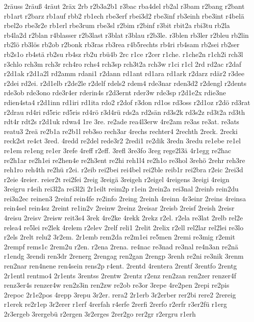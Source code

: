 {2räuss
2räuß
4räut
2räx
2rb
r2b3a2b1
r3bac
rba4del
rb2al
r3bam
r2bang
r2bant
rb1art
r2barz
rb1auf
rbb2
rb1ech
rbe3erf
rbei3d2
rbe3inf
rb3einh
rbe3int
r4belä
rbel2o
rbe3r2e
rb1erl
rbe3rum
rbe3sl
r2bim
r2binf
r3bit
rbit2a
rbi3tu
rb2la
rb4la2d
r2blan
r4blasser
r2b3last
r3blat
r3blau
r2b3le.
r3blen
rb3ler
r2bleu
rb2lin
rb2lö
rb3lös
rb2ob
r2bonk
rb3ras
rb3rea
r4b5rechts
rb4ri
rb4sam
rb2sei
rb2ser
rb2s1o
rb4stä
rb2su
rb4sz
rb2u
rbü4b
2rc
r1ce
r2cer
r1che.
r1che2n
r1ch2i
rch3l
r3chlo
rch3m
rch3r
rch4ro
rchs4
rch3sp
rch3t2a
rch3w
r1ci
r1cl
2rd
rd2ac
r2daf
r2d1ak
r2d1a2l
rd2amm
rdani1
r2dann
rd1ant
rd1ara
rd1ark
r2darz
rdär2
r3dee
r2dei
rd2ei.
r2d1elb
r2de2le
r2delf
rdels2
rdem4
rde3nar
rden3d2
r2dengl
r2dents
rde3ob
rde3ono
rde3r4er
rderin4s
r2d3ernt
rder3w
rde3sp
r2d1e2x
rdie3ne
rdien4sta4
r2d1inn
rd1iri
rd1ita
rdo2
r2dof
r3don
rd1os
rd3oss
r2d1oz
r2dö
rd3rat
r2drau
rd4ri
rd5ric
rd5ris
rd4rö
r3d4rü
rds2a
rd2sän
rd3s2k
rd3s2z
rd3t2a
rd3th
rdt4r
rdt2s
r2d1uk
rdwa4
1re
3re.
re2ade
rea4l3erw
4re2am
re3as
re3at.
re3ats
reatu3
2reä
re2b1a
re2b1l
reb3so
rech3ar
4rechs
rechter4
2rechth
2reck.
2recki
reck2st
re4ct
3red.
4redd
re2del
rede3r2
2redi1
re2dik
3redn
3redu
re1ebe
re1el
re1em
re1eng
re1er
3refe
4reff
r2eff.
3refl
3re3fo
3reg
rege2l3ä
4r1egg
re2hac
re2h1ar
re2h1ei
re2hen4e
re2h3ent
re2hi
reh1l4
re2h1o
re3hol
3rehö
2rehr
reh3re
reh1ro
reh4th
re2hü
r2ei.
r2eib
rei2bei
rei4bel
rei2ble
reib1r
rei2bra
r2eic
2rei3d
r2eie
4reier.
reier2t
rei2fei
2reig
3reigä
3reigeh
r2eigel
4reigens
3reigi
4reign
3reigru
r4eih
rei3l2a
rei3l2i
2r1eilt
reim2p
r1ein
2rein2a
rei3nal
2reinb
rein2du
rei3n2ec
reinen3
2reinf
rein4fe
re2info
2reing
2reinh
4reinn
4r3einr
2reins
4reinsa
rein4sel
rein4sz
2reint
re1in2v
2reinw
2reinz
2reisar
2reisb
2reisf
2reish
2reisr
4reisu
2reisv
2reisw
reit3s4
3rek
4re2ke
4rekk
2rekz
r2el.
r2ela
re3lat
2relb
rel2e
relea4
re5lei
re2lek
4relem
r2elev
2relf
reli1
2relit
2relix
r2ell
rel2lar
rel2lei
re3lo
r2els
2relt
relu2
3r2em.
2r1emb
rem2da
re2m1ei
re5men
2remi
re3mig
r2emit
2rempf
rems1c
2rem2u
r2en.
r2ena
2rena.
re4nac
re3nad
re3nal
re4n3an
re2nä
r1endg
3rendi
ren3dr
2renerg
2rengag
ren2gan
2rengp
3renh
re2ni
re3nik
3renm
ren2nar
ren4nene
ren4sein
rens2p
r4ent.
2rentd
4rentera
2rentf
3rentfo
2rentg
2r1entl
rentmo4
2r1ents
3rentss
2rentw
2rentz
r2enz
ren2zan
ren2zer
renzer4f
renz3er4s
renzer4w
ren2z3in
ren2zw
re2ob
re3or
3repe
4re2pen
2repi
re2pis
2repoc
2r1e2pos
4repp
3repu
3r2er.
rera2
2r1erb
3r2erber
rer2bi
rere2
2rereig
r1erek
re2r1ep
3r2erer
r1erf
4rerfah
r4erfe
2rerfi
2rerfo
r2erfr
r3er2fü
r1erg
2r3ergeb
3rergebü
r2ergen
3r2erges
2rer2go
rer2gr
r2ergru
r1erh
}
